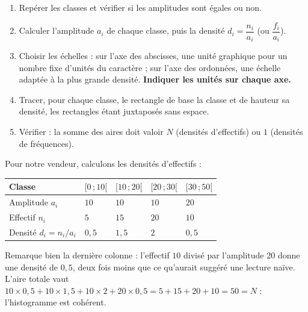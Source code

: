 \documentclass[11pt]{article}
\begin{document}
\begin{methode}
\begin{enumerate}
\item Repérer les classes et vérifier si les amplitudes sont égales ou non.
\item Calculer l'amplitude $a_i$ de chaque classe, puis la densité $d_i = \dfrac{n_i}{a_i}$ (ou $\dfrac{f_i}{a_i}$).
\item Choisir les échelles : sur l'axe des abscisses, une unité graphique pour un nombre fixe d'unités du caractère ; sur l'axe des ordonnées, une échelle adaptée à la plus grande densité. \textbf{Indiquer les unités sur chaque axe.}
\item Tracer, pour chaque classe, le rectangle de base la classe et de hauteur sa densité, les rectangles étant juxtaposés sans espace.
\item Vérifier : la somme des aires doit valoir $N$ (densités d'effectifs) ou $1$ (densités de fréquences).
\end{enumerate}
\end{methode}

\begin{exemplebox}
Pour notre vendeur, calculons les densités d'effectifs :
\begin{center}
\begin{tabularx}{\linewidth}{|l|X|X|X|X|}\hline
\rowcolor{popblueL} Classe & $[0\,;10[$ & $[10\,;20[$ & $[20\,;30[$ & $[30\,;50[$ \\ \hline
Amplitude $a_i$ & $10$ & $10$ & $10$ & $20$ \\ \hline
Effectif $n_i$ & $5$ & $15$ & $20$ & $10$ \\ \hline
Densité $d_i = n_i/a_i$ & $0,5$ & $1,5$ & $2$ & $0,5$ \\ \hline
\end{tabularx}
\end{center}
Remarque bien la dernière colonne : l'effectif $10$ divisé par l'amplitude $20$ donne une densité de $0,5$, deux fois moins que ce qu'aurait suggéré une lecture naïve. L'aire totale vaut $10 \times 0,5 + 10 \times 1,5 + 10 \times 2 + 20 \times 0,5 = 5 + 15 + 20 + 10 = 50 = N$ : l'histogramme est cohérent.
\end{exemplebox}
\end{document}
